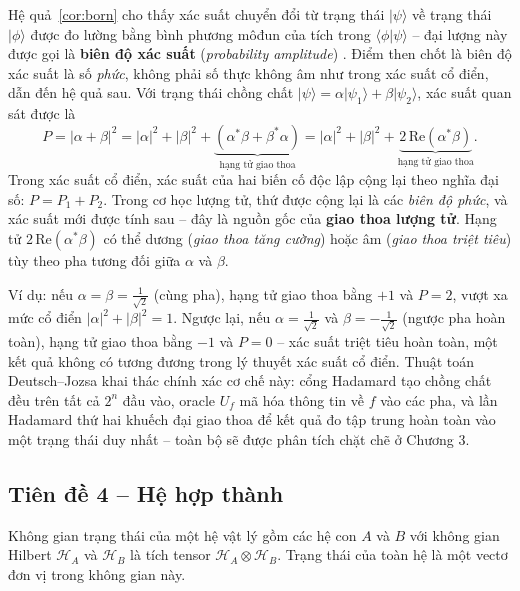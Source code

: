 \begin{remark}
Hệ quả~\ref{cor:born} cho thấy xác suất chuyển đổi từ trạng thái $|\psi\rangle$ về trạng thái $|\phi\rangle$ được đo lường bằng bình phương môđun của tích
trong $\langle\phi|\psi\rangle$ -- đại lượng này được gọi là \textbf{biên độ xác suất}
(\textit{probability amplitude}) \cite{ref4}. Điểm then chốt là biên độ xác suất là số
\emph{phức}, không phải số thực không âm như trong xác suất cổ điển, dẫn đến hệ quả
sau. Với trạng thái chồng chất $|\psi\rangle = \alpha|\psi_1\rangle + \beta|\psi_2\rangle$,
xác suất quan sát được là
$$P = |\alpha + \beta|^2 = |\alpha|^2 + |\beta|^2
  + \underbrace{(\alpha^*\beta + \beta^*\alpha)}_{\text{hạng tử giao thoa}} = |\alpha|^2 + |\beta|^2
+ \underbrace{2\,\text{Re}(\alpha^*\beta)}_{\text{hạng tử giao thoa}}.$$
Trong xác suất cổ điển, xác suất của hai biến cố độc lập cộng lại theo nghĩa đại
số: $P = P_1 + P_2$. Trong cơ học lượng tử, thứ được cộng lại là các \emph{biên độ
phức}, và xác suất mới được tính sau -- đây là nguồn gốc của \textbf{giao thoa lượng
tử}. Hạng tử $2\,\text{Re}(\alpha^*\beta)$ có thể dương (\textit{giao thoa tăng
cường}) hoặc âm (\textit{giao thoa triệt tiêu}) tùy theo pha tương đối giữa $\alpha$
và $\beta$.

Ví dụ: nếu $\alpha = \beta = \frac{1}{\sqrt{2}}$ (cùng pha), hạng tử giao thoa bằng
$+1$ và $P = 2$, vượt xa mức cổ điển $|\alpha|^2 + |\beta|^2 = 1$. Ngược lại, nếu
$\alpha = \frac{1}{\sqrt{2}}$ và $\beta = -\frac{1}{\sqrt{2}}$ (ngược pha hoàn toàn),
hạng tử giao thoa bằng $-1$ và $P = 0$ -- xác suất triệt tiêu hoàn toàn, một kết
quả không có tương đương trong lý thuyết xác suất cổ điển. Thuật toán Deutsch--Jozsa
khai thác chính xác cơ chế này: cổng Hadamard tạo chồng chất đều trên tất cả $2^n$
đầu vào, oracle $U_f$ mã hóa thông tin về $f$ vào các pha, và lần Hadamard thứ hai
khuếch đại giao thoa để kết quả đo tập trung hoàn toàn vào một trạng thái duy nhất
-- toàn bộ sẽ được phân tích chặt chẽ ở Chương 3.
\end{remark}

\subsection*{Tiên đề 4 -- Hệ hợp thành}

\begin{postulate}
Không gian trạng thái của một hệ vật lý gồm các hệ con $A$ và $B$ với không gian
Hilbert $\mathcal{H}_A$ và $\mathcal{H}_B$ là tích tensor
$\mathcal{H}_A \otimes \mathcal{H}_B$. Trạng thái của toàn hệ là một vectơ đơn vị
trong không gian này.
\end{postulate}


